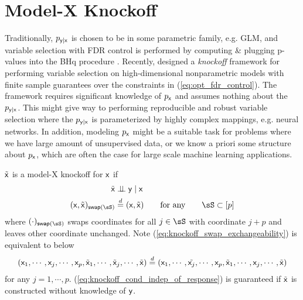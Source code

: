 \documentclass[11pt]{article}
\begin{document}
\section{Model-X Knockoff}

Traditionally, $p_{\mathsf{y}|\mathsf{x}}$ is chosen to be in some parametric family, e.g. GLM, and variable selection with FDR control is performed by computing \& plugging p-values into the BHq procedure \cite{benjaminiControllingFalseDiscovery1995}. Recently, \cite{barberControllingFalseDiscovery2015,candesPanningGoldModelX2017} designed a \textit{knockoff} framework for performing variable selection on high-dimensional nonparametric models with finite sample guarantees over the constraints in (\ref{eq:opt_fdr_control}). The framework requires significant knowledge of $p_{\mathsf{x}}$ and assumes nothing about the $p_{\mathsf{y}|\mathsf{x}}$. This might give way to performing reproducible and robust variable selection where the $p_{\mathsf{y}|\mathsf{x}}$ is parameterized by highly complex mappings, e.g. neural networks. In addition, modeling $p_{\mathsf{x}}$ might be a suitable task for problems where we have large amount of unsupervised data, or we know a priori some structure about $p_{\mathsf{x}}$, which are often the case for large scale machine learning applications. 
\begin{definition*} 
    $\tilde{\mathsf{x}}$ is a model-X knockoff for $\mathsf{x}$ if 
    \begin{align}
        \tilde{\rx} 
            &\dperp \ry \mid \rx 
            \label{eq:knockoff_cond_indep_of_response} \\
        (\rx,\tilde{\rx})_{\textsf{swap}(\sS)}
            &\overset{d}{=} (\rx,\tilde{\rx})
            \quad\quad\text{for any}\quad\quad
            \sS\subset[p]
            \label{eq:knockoff_swap_exchangeability}
    \end{align}
    where $(\cdot)_{\textsf{swap}(\sS)}$ swaps coordinates for all $j\in\sS $ with coordinate $j+p$ and leaves other coordinate unchanged. Note (\ref{eq:knockoff_swap_exchangeability}) is equivalent to below
    \begin{align}
        (\mathsf{x}_1,\cdots,\mathsf{x}_j,\cdots,\mathsf{x}_p, \tilde{\mathsf{x}}_1,\cdots,\tilde{\mathsf{x}}_j,\cdots,\tilde{\mathsf{x}})
            \overset{d}{=}
            (\mathsf{x}_1,\cdots,\tilde{\mathsf{x}_j},\cdots,\mathsf{x}_p, \tilde{\mathsf{x}}_1,\cdots,\mathsf{x}_j,\cdots,\tilde{\mathsf{x}})
    \end{align}
    for any $j=1,\cdots,p$. (\ref{eq:knockoff_cond_indep_of_response}) is guaranteed if $\tilde{\mathsf{x}}$ is constructed without knowledge of $\mathsf{y}$. 
\end{definition*}
\end{document}
